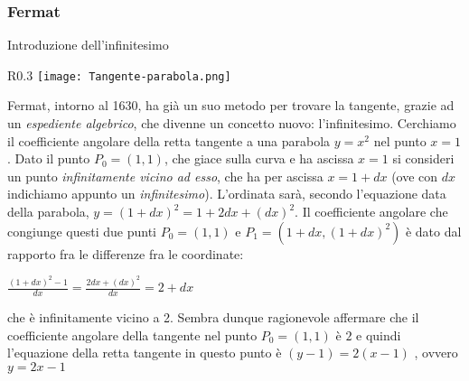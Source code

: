 \begin{frame}[label=Fermat]
    \frametitle{Fermat}
    \begin{block}{Introduzione dell'infinitesimo}
        \begin{wrapfigure}{R}{0.3\textwidth}
            \centering
            \texttt{[image: Tangente-parabola.png]}
        \end{wrapfigure}

        Fermat, intorno al 1630, ha già un suo metodo per trovare la tangente, 
        grazie ad un \textit{espediente algebrico}, 
        che divenne un concetto nuovo: \alert{l'infinitesimo}.
        \pause
        Cerchiamo il coefficiente angolare della retta tangente a una parabola
        $y = x^2$ nel punto $x=1$. Dato il punto $P_0=(1,1)$, che giace sulla curva 
        e ha ascissa $x=1$ si consideri 
        un punto \textit{infinitamente vicino ad esso}, che ha per ascissa $x=1+dx$
        (ove con $dx$ indichiamo appunto un \textit{infinitesimo}).
        L'ordinata sarà, secondo l'equazione data della parabola,
        $y= {(1+dx)}^2 = {1 + 2dx + {(dx)}^2}$.
        Il coefficiente angolare che congiunge questi due punti $P_0=(1,1)$ e 
        $P_1=(1+dx,{(1+dx)}^2)$ è dato dal rapporto fra le differenze fra le coordinate:
        \begin{center}
            $\frac{{(1+dx)}^2-1}{dx} = \frac{2dx+{(dx)}^2}{dx} = 2 + dx$
        \end{center}
        che è infinitamente vicino a 2. Sembra dunque ragionevole affermare che 
        il coefficiente angolare della tangente nel punto $P_0=(1,1)$ è $2$ e quindi 
        l'equazione della retta tangente in questo punto è
            $(y-1) = 2(x-1)$ , ovvero $y = 2x -1$
    \end{block}
\end{frame}